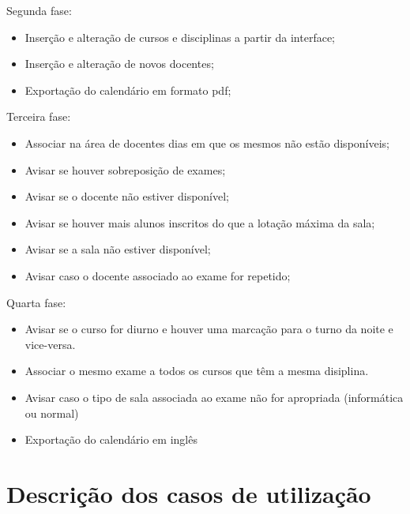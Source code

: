 \documentclass[11pt, twoside]{report}
\begin{document}
	Segunda fase:
	\begin{itemize}
		\item Inserção e alteração de cursos e disciplinas a partir da interface;
		\item Inserção e alteração de novos docentes;
		\item Exportação do calendário em formato pdf;
	\end{itemize}


	Terceira fase:
	\begin{itemize}
		\item Associar na área de docentes dias em que os mesmos não estão disponíveis;
		\item Avisar se houver sobreposição de exames;
		\item Avisar se o docente não estiver disponível;
		\item Avisar se houver mais alunos inscritos do que a lotação máxima da sala;
		\item Avisar se a sala não estiver disponível;
		\item Avisar caso o docente associado ao exame for repetido;
	\end{itemize}
	
	Quarta fase:
	\begin{itemize}
		\item Avisar se o curso for diurno e houver uma marcação para o turno da noite e vice-versa.
		\item Associar o mesmo exame a todos os cursos que têm a mesma disiplina.
		\item Avisar caso o tipo de sala associada ao exame não for apropriada (informática ou normal)
		\item Exportação do calendário em inglês
	\end{itemize}

	
	\section{Descrição dos casos de utilização}
	
	
		
\end{document}
